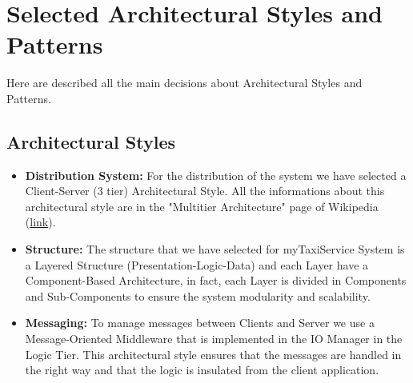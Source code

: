 \documentclass[../../../../dd.tex]{subfiles}
\begin{document}
	\section{Selected Architectural Styles and Patterns}
		Here are described all the main decisions about Architectural Styles and Patterns.
		\subsection{Architectural Styles}
			
			\begin{itemize}
				\item \textbf{Distribution System:} For the distribution of the system we have selected a Client-Server (3 tier) Architectural Style. All the informations about this architectural style are in the "Multitier Architecture" page of Wikipedia (\href{https://en.wikipedia.org/wiki/Multitier_architecture#Three-tier_architecture}{link}).
				
				\item \textbf{Structure:} The structure that we have selected for myTaxiService System is a Layered Structure (Presentation-Logic-Data) and each Layer have a Component-Based Architecture, in fact, each Layer is divided in Components and Sub-Components to ensure the system modularity and scalability.

				\item \textbf{Messaging:} To manage messages between Clients and Server we use a Message-Oriented Middleware that is implemented in the IO Manager in the Logic Tier. This architectural style ensures that the messages are handled in the right way and that the logic is insulated from the client application.

			\end{itemize}
\end{document}
